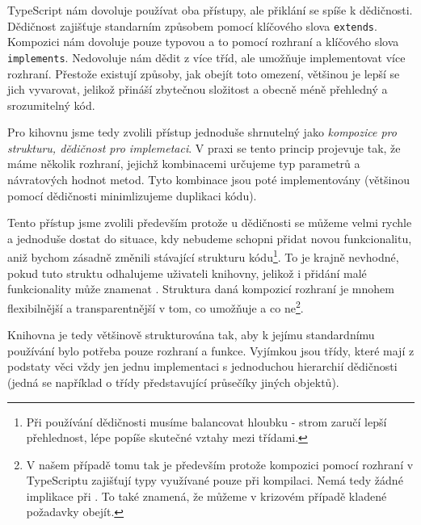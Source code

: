 TypeScript nám dovoluje používat oba přístupy, ale přiklání se spíše k dědičnosti.
Dědičnost zajišťuje standarním způsobem pomocí klíčového slova \texttt{extends}\cite{mdn:extends}.
Kompozici nám dovoluje pouze typovou a to pomocí rozhraní a klíčového slova \texttt{implements}\cite{TypeScript:classes}.
Nedovoluje nám dědit z více tříd, ale umožňuje implementovat více rozhraní\cite{TypeScript:classes}.
Přestože existují způsoby, jak obejít toto omezení\cite{TypeScript:mixins}, většinou je lepší se jich vyvarovat, jelikož přináší zbytečnou složitost a obecně méně přehledný a srozumitelný kód.

Pro kihovnu jsme tedy zvolili přístup jednoduše shrnutelný jako \textit{kompozice pro strukturu, dědičnost pro implemetaci}\cite{geometryjs:wiki:code-structure}.
V praxi se tento princip projevuje tak, že máme několik rozhraní, jejichž kombinacemi určujeme typ parametrů a návratových hodnot metod.
Tyto kombinace jsou poté implementovány (většinou pomocí dědičnosti minimlizujeme duplikaci kódu).

Tento přístup jsme zvolili především protože u dědičnosti se můžeme velmi rychle a jednoduše dostat do situace, kdy nebudeme schopni přidat novou funkcionalitu, aniž bychom zásadně změnili stávající strukturu kódu\footnote{Při používání dědičnosti musíme balancovat hloubku  -  strom zaručí lepší přehlednost,  lépe popíše skutečné vztahy mezi třídami.}.
To je krajně nevhodné, pokud tuto struktu odhalujeme uživateli knihovny, jelikož i přidání malé funkcionality může znamenat .
Struktura daná kompozicí rozhraní je mnohem flexibilnější a transparentnější v tom, co umožňuje a co ne\footnote{V našem případě tomu tak je především protože kompozici pomocí rozhraní v TypeScriptu zajišťují typy využívané pouze při kompilaci. Nemá tedy žádné implikace při . To také znamená, že můžeme v krizovém případě kladené požadavky obejít.}.

Knihovna je tedy většinově strukturována tak, aby k jejímu standardnímu používání bylo potřeba  pouze rozhraní a funkce\cite{geometryjs:wiki:code-structure}.
Vyjímkou jsou třídy, které mají z podstaty věci vždy jen jednu implementaci s jednoduchou hierarchií dědičnosti (jedná se například o třídy představující průsečíky jiných objektů)\cite{geometryjs:source:geometryObjects:intersections}.
